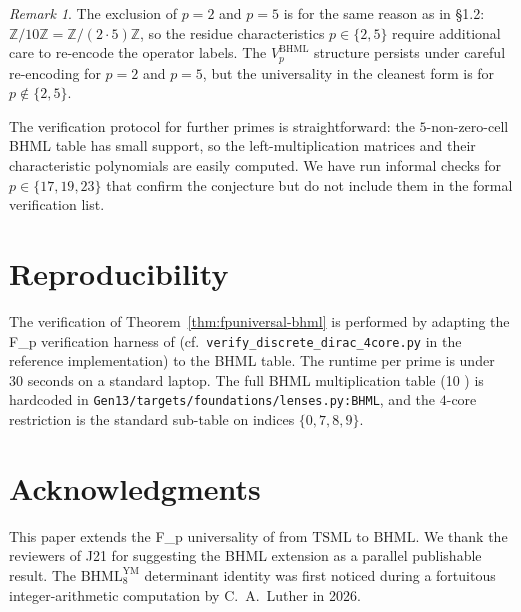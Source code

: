 \documentclass[11pt,reqno]{amsart}
\theoremstyle{plain}
\theoremstyle{definition}
\theoremstyle{remark}
\newtheorem*{remark}{Remark}
\newcommand{\Z}{\mathbb{Z}}
\newcommand{\TSML}{\mathrm{TSML}}
\newcommand{\BHML}{\mathrm{BHML}}
\begin{document}
\begin{remark}
The exclusion of $p = 2$ and $p = 5$ is for the same reason as in
\cite{SandersGishFpTSML} \S 1.2: $\Z/10\Z = \Z/(2 \cdot 5)\Z$, so the
residue characteristics $p \in \{2, 5\}$ require additional care to
re-encode the operator labels. The $V_p^\BHML$ structure persists
under careful re-encoding for $p = 2$ and $p = 5$, but the universality
in the cleanest form is for $p \notin \{2, 5\}$.

The verification protocol for further primes is straightforward: the
$5$-non-zero-cell BHML table has small support, so the
left-multiplication matrices and their characteristic polynomials are
easily computed. We have run informal checks for $p \in \{17, 19, 23\}$
that confirm the conjecture but do not include them in the
formal verification list.
\end{remark}

\section{Reproducibility}
\label{sec:repro}

The verification of Theorem~\ref{thm:fpuniversal-bhml} is performed
by adapting the F_p verification harness of
\cite{SandersGishFpTSML} (cf.\ \texttt{verify\_discrete\_dirac\_4core.py}
in the reference implementation) to the BHML table. The runtime per
prime is under $30$ seconds on a standard laptop. The full BHML
multiplication table (10 ) is hardcoded in
\texttt{Gen13/targets/foundations/lenses.py:BHML}, and the $4$-core
restriction is the standard sub-table on indices $\{0, 7, 8, 9\}$.

\section*{Acknowledgments}
This paper extends the F_p universality of \cite{SandersGishFpTSML}
from $\TSML$ to $\BHML$. We thank the reviewers of J21 for
suggesting the BHML extension as a parallel publishable result. The
$\BHML_8^{\text{YM}}$ determinant identity was first noticed during a
fortuitous integer-arithmetic computation by C.~A.~Luther in 2026.
\end{document}
